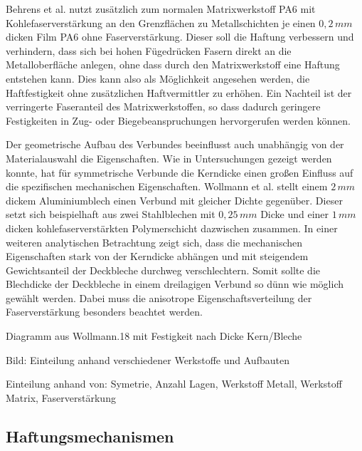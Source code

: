 Behrens et al. \cite{BerndArno.2017} nutzt zusätzlich zum normalen Matrixwerkstoff PA6 mit Kohlefaserverstärkung an den Grenzflächen zu Metallschichten je einen $0,2 \, mm$ dicken Film PA6 ohne Faserverstärkung.
Dieser soll die Haftung verbessern und verhindern, dass sich bei hohen Fügedrücken Fasern direkt an die Metalloberfläche anlegen, ohne dass durch den Matrixwerkstoff eine Haftung entstehen kann.
Dies kann also als Möglichkeit angesehen werden, die Haftfestigkeit ohne zusätzlichen Haftvermittler zu erhöhen.
Ein Nachteil ist der verringerte Faseranteil des Matrixwerkstoffen, so dass dadurch geringere Festigkeiten in Zug- oder Biegebeanspruchungen hervorgerufen werden können.


Der geometrische Aufbau des Verbundes beeinflusst auch unabhängig von der Materialauswahl die Eigenschaften.
Wie in Untersuchungen gezeigt werden konnte, hat für symmetrische Verbunde die Kerndicke einen großen Einfluss auf die spezifischen mechanischen Eigenschaften.
Wollmann et al. \cite{Wollmann.2018} stellt einem $2\,mm$ dickem Aluminiumblech einen Verbund mit gleicher Dichte gegenüber.
Dieser setzt sich beispielhaft aus zwei Stahlblechen mit $0,25\,mm$ Dicke und einer $1\,mm$ dicken kohlefaserverstärkten Polymerschicht dazwischen zusammen.
In einer weiteren analytischen Betrachtung zeigt sich, dass die mechanischen Eigenschaften stark von der Kerndicke abhängen und mit steigendem Gewichtsanteil der Deckbleche durchweg verschlechtern.
Somit sollte die Blechdicke der Deckbleche in einem dreilagigen Verbund so dünn wie möglich gewählt werden.
Dabei muss die anisotrope Eigenschaftsverteilung der Faserverstärkung besonders beachtet werden.

Diagramm aus Wollmann.18 mit Festigkeit nach Dicke Kern/Bleche


Bild: Einteilung anhand verschiedener Werkstoffe und Aufbauten


Einteilung anhand von: Symetrie, Anzahl Lagen, Werkstoff Metall, Werkstoff Matrix, Faserverstärkung

\subsection{Haftungsmechanismen}\label{sec:Haftung}


